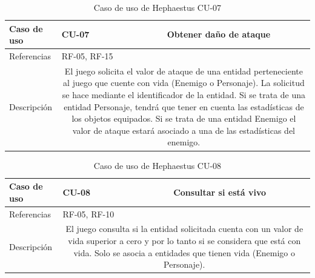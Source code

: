 \begin{table}[H]
	\centering
	\small
	\begin{tabularx}{\linewidth}{|l|cc|}
		\hline
		{\cellcolor[HTML]{C0C0C0} Caso de uso} & \multicolumn{1}{l|}{CU-07} & Obtener daño de ataque \\ \hline
		{\cellcolor[HTML]{C0C0C0} Referencias} & \multicolumn{2}{l|}{RF-05, RF-15} \\ \hline
		{\cellcolor[HTML]{C0C0C0} Descripción} & \multicolumn{2}{X|}{El juego solicita el valor de ataque de una entidad perteneciente al juego que cuente con vida (Enemigo o Personaje). La solicitud se hace mediante el identificador de la entidad. Si se trata de una entidad Personaje, tendrá que tener en cuenta las estadísticas de los objetos equipados. Si se trata de una entidad Enemigo el valor de ataque estará asociado a una de las estadísticas del enemigo.} \\ \hline
	\end{tabularx}
	
	\vspace{0.5cm}
	\caption{Caso de uso de Hephaestus CU-07}
	\label{tab:hephaestus-cu-07}
\end{table}

\begin{table}[H]
	\centering
	\small
	\begin{tabularx}{\linewidth}{|l|cc|}
		\hline
		{\cellcolor[HTML]{C0C0C0} Caso de uso} & \multicolumn{1}{l|}{CU-08} & Consultar si está vivo \\ \hline
		{\cellcolor[HTML]{C0C0C0} Referencias} & \multicolumn{2}{l|}{RF-05, RF-10} \\ \hline
		{\cellcolor[HTML]{C0C0C0} Descripción} & \multicolumn{2}{X|}{El juego consulta si la entidad solicitada cuenta con un valor de vida superior a cero y por lo tanto si se considera que está con vida. Solo se asocia a entidades que tienen vida (Enemigo o Personaje).} \\ \hline
	\end{tabularx}
	
	\vspace{0.5cm}
	\caption{Caso de uso de Hephaestus CU-08}
	\label{tab:hephaestus-cu-08}
\end{table}

